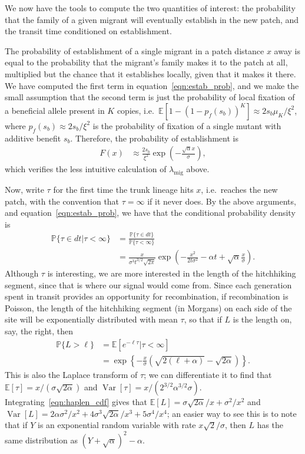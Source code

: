 \documentclass{article}
\DeclareMathOperator{\var}{Var}
\renewcommand{\P}{\mathbb{P}}
\newcommand{\E}{\mathbb{E}}
\newcommand{\migrate}{\lambda_\text{mig}}
\begin{document}
We now have the tools to compute the two quantities of interest:
the probability that the family of a given migrant will eventually establish in the new patch,
and the transit time conditioned on establishment.

The probability of establishment of a single migrant in a patch distance $x$ away
is equal to the probability that the migrant's family makes it to the patch at all,
multiplied but the chance that it establishes locally, given that it makes it there.
We have computed the first term in equation~\eqref{eqn:estab_prob},
and we make the small assumption that the second term is just the probability of local fixation
of a beneficial allele present in $K$ copies,
i.e.~$\E[1-(1-p_f(s_b))^K] \approx 2 s_b \mu_K/\xi^2$,
where $p_f(s_b) \approx 2s_b/\xi^2$ is the probability of fixation of a single mutant with additive benefit $s_b$.
Therefore, the probability of establishment is
\begin{align}
  F(x) &\approx \frac{2s_b}{\xi^2} \exp\left( - \frac{\sqrt{\alpha} x}{\sigma} \right) ,
\end{align}
which verifies the less intuitive calculation of $\migrate$ above.

Now, write $\tau$ for the first time the trunk lineage hits $x$, i.e.\ reaches the new patch,
with the convention that $\tau=\infty$ if it never does.
By the above arguments, and equation~\eqref{eqn:estab_prob}, we have that the conditional probability density is
\begin{align}
  \P\{\tau\in dt | \tau<\infty \} &= \frac{\P\{\tau \in dt\}}{\P\{\tau<\infty\}} \\
  &= \frac{x}{\sigma^3 t^{3/2}\sqrt{2\pi}} \exp\left(-\frac{x^2}{2t\sigma^2} -\alpha t + \sqrt{\alpha} \frac{x}{\sigma} \right) .
\end{align}
Although $\tau$ is interesting, we are more interested in the length of the hitchhiking segment,
since that is where our signal would come from.
Since each generation spent in transit provides an opportunity for recombination,
if recombination is Poisson, the length of the hitchhiking segment (in Morgans) on each side of the site will be exponentially distributed
with mean $\tau$, so that if $L$ is the length on, say, the right, then
\begin{align} \label{eqn:haplen_cdf}
\P\{L>\ell\} &= \E[e^{-\ell \tau}|\tau<\infty] \\
&= \exp\left\{{-\frac{x}{\sigma}\left(\sqrt{2(\ell+\alpha)} - \sqrt{2\alpha}\right)}\right\} .
\end{align}
This is also the Laplace transform of $\tau$;
we can differentiate it to find that $\E[\tau] = x/(\sigma\sqrt{2\alpha})$
and $\var[\tau] = x/( 2^{3/2}\alpha^{3/2}\sigma)$.
Integrating~\eqref{eqn:haplen_cdf} gives that 
$\E[L] = \sigma \sqrt{2\alpha}/x + \sigma^2/x^2$ and $\var[L] = 2\alpha\sigma^2/x^2 + 4 \sigma^3 \sqrt{2\alpha}/x^3 + 5 \sigma^4 / x^4$;
an easier way to see this is to note that if $Y$ is an exponential random variable with rate $x\sqrt{2}/\sigma$,
then $L$ has the same distribution as $(Y + \sqrt{\alpha})^2 - \alpha$.
\end{document}
